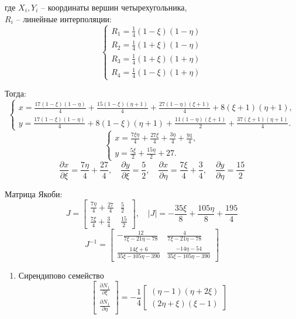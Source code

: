 \documentclass[a4paper, 12pt]{article}
\begin{document}
\begin{enumerate}
		где \(X_i, Y_i\) -- координаты вершин четырехугольника, \\
		$R_i$ -- линейные интерполяции:
		\[
			\begin{cases}
				R_1=\frac{1}{4}(1-\xi)(1-\eta) \\
				R_2=\frac{1}{4}(1+\xi)(1-\eta) \\
				R_3=\frac{1}{4}(1+\xi)(1+\eta) \\
				R_4=\frac{1}{4}(1-\xi)(1+\eta)
			\end{cases}
		\]

		Тогда:
		\[
			\begin{cases}
				x = \frac{17 \left(1 - \xi\right) \left(1 - \eta\right)}{4} + \frac{15 \left(1 - \xi\right) \left(\eta + 1\right)}{4} + \frac{27 \left(1 - \eta\right) \left(\xi + 1\right)}{4} + 8 \left(\xi + 1\right) \left(\eta + 1\right),\\
				y = \frac{17 \left(1 - \xi\right) \left(1 - \eta\right)}{4} + 8 \left(1 - \xi\right) \left(\eta + 1\right) + \frac{11 \left(1 - \eta\right) \left(\xi + 1\right)}{2} + \frac{37 \left(\xi + 1\right) \left(\eta + 1\right)}{4}.
			\end{cases}
		\]
		\[
			\begin{cases}
				x = \frac{7 \xi \eta}{4} + \frac{27 \xi}{4} + \frac{3 \eta}{4} + \frac{91}{4},\\
				y = \frac{5 \xi}{2} + \frac{15 \eta}{2} + 27.
			\end{cases}
		\]
		\[
			\frac{\partial x}{\partial \xi} = \frac{7 \eta}{4} + \frac{27}{4}, \quad \frac{\partial y}{\partial \xi} = \frac{5}{2}, \quad
			\frac{\partial x}{\partial \eta} = \frac{7 \xi}{4} + \frac{3}{4}, \quad \frac{\partial y}{\partial \eta} = \frac{15}{2}
		\]

		Матрица Якоби:
		\[
			J = 
			\left[\begin{matrix}\frac{7 \eta}{4} + \frac{27}{4} & \frac{5}{2}\\\frac{7 \xi}{4} + \frac{3}{4} & \frac{15}{2}\end{matrix}\right], \quad
			|J| = - \frac{35 \xi}{8} + \frac{105 \eta}{8} + \frac{195}{4}
		\]
		\[
			J^{-1} = \left[\begin{matrix}- \frac{12}{7\xi - 21\eta - 78} & \frac{4}{7\xi - 21\eta - 78}\\\frac{14\xi + 6}{35\xi - 105\eta - 390} & \frac{- 14\eta - 54}{35\xi - 105\eta - 390}\end{matrix}\right]
		\]
		\begin{enumerate}
			\item Сирендипово семейство
			\[
				\begin{bmatrix}
				\frac{\partial N_1}{\partial \xi} \\ 
				\frac{\partial N_1}{\partial \eta}
				\end{bmatrix}
				=
				-\frac{1}{4}
				\begin{bmatrix}
				(\eta - 1)(\eta + 2\xi) \\ 
				(2\eta + \xi)(\xi - 1)
				\end{bmatrix}
			\]


\end{enumerate}
\end{enumerate}
\end{document}
